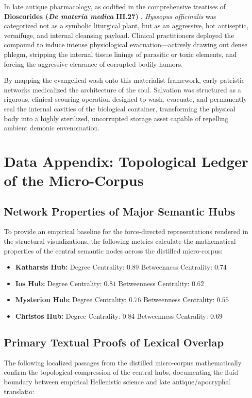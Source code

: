 \documentclass[11pt,twoside,a4paper]{article}
\begin{document}
In late antique pharmacology, as codified in the comprehensive treatises of \textbf{Dioscorides (\textit{De materia medica} III.27)} \cite{dioscorides1906wellmann}, \textit{Hyssopus officinalis} was categorized not as a symbolic liturgical plant, but as an aggressive, hot antiseptic, vermifuge, and internal cleansing payload. Clinical practitioners deployed the compound to induce intense physiological evacuation—actively drawing out dense phlegm, stripping the internal tissue linings of parasitic or toxic elements, and forcing the aggressive clearance of corrupted bodily humors. 

By mapping the evangelical wash onto this materialist framework, early patristic networks medicalized the architecture of the soul. Salvation was structured as a rigorous, clinical scouring operation designed to wash, evacuate, and permanently seal the internal cavities of the biological container, transforming the physical body into a highly sterilized, uncorrupted storage asset capable of repelling ambient demonic envenomation.


\section{Data Appendix: Topological Ledger of the Micro-Corpus}
\label{sec:data_appendix}

\subsection{Network Properties of Major Semantic Hubs}
To provide an empirical baseline for the force-directed representations rendered in the structural visualizations, the following metrics calculate the mathematical properties of the central semantic nodes across the distilled micro-corpus:

\begin{itemize}
 \item \textbf{Katharsis Hub:} Degree Centrality: $0.89$ \textbar{} Betweenness Centrality: $0.74$
 \item \textbf{Ios Hub:} Degree Centrality: $0.81$ \textbar{} Betweenness Centrality: $0.62$
 \item \textbf{Mysterion Hub:} Degree Centrality: $0.76$ \textbar{} Betweenness Centrality: $0.55$
 \item \textbf{Christos Hub:} Degree Centrality: $0.84$ \textbar{} Betweenness Centrality: $0.69$
\end{itemize}

\subsection{Primary Textual Proofs of Lexical Overlap}
The following localized passages from the distilled micro-corpus mathematically confirm the topological compression of the central hubs, documenting the fluid boundary between empirical Hellenistic science and late antique/apocryphal translatio:
\end{document}
